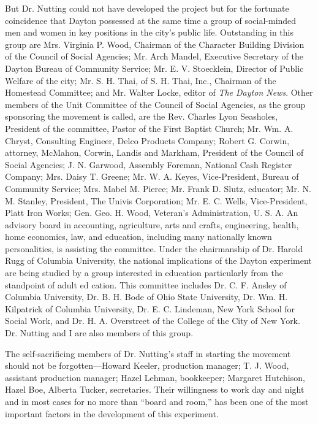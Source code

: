 \documentclass{book}
\begin{document}
But Dr. Nutting could not have developed the project but for the fortunate coincidence that Dayton possessed at the same time a group of social-minded men and women in key positions in the city’s public life. Outstanding in this group are Mrs. Virginia P. Wood, Chairman of the Character Building Division of the Council of Social Agencies; Mr. Arch Mandel, Executive Secretary of the Dayton Bureau of Community Service; Mr. E. V. Stoecklein, Director of Public Welfare of the city; Mr. S. H. Thai, of S. H. Thai, Inc., Chairman of the Homestead Committee; and Mr. Walter Locke, editor of \emph{The Dayton News}. Other members of the Unit Committee of the Council of Social Agencies, as the group sponsoring the movement is called, are the Rev. Charles Lyon Seasholes, President of the committee, Pastor of the First Baptist Church; Mr. Wm. A. Chryst, Consulting Engineer, Delco Products Company; Robert G. Corwin, attorney, McMahon, Corwin, Landis and Markham, President of the Council of Social Agencies; J. N. Garwood, Assembly Foreman, National Cash Register Company; Mrs. Daisy T. Greene; Mr. W. A. Keyes, Vice-President, Bureau of Community Service; Mrs. Mabel M. Pierce; Mr. Frank D. Slutz, educator; Mr. N. M. Stanley, President, The Univis Corporation; Mr. E. C. Wells, Vice-President, Platt Iron Works; Gen. Geo. H. Wood, Veteran’s Administration, U. S. A. An advisory board in accounting, agriculture, arts and crafts, engineering, health, home economics, law, and education, including many nationally known personalities, is assisting the committee. Under the chairmanship of Dr. Harold Rugg of Columbia University, the national implications of the Dayton experiment are being studied by a group interested in education particularly from the standpoint of adult ed cation. This committee includes Dr. C. F. Ansley of Columbia University, Dr. B. H. Bode of Ohio State University, Dr. Wm. H. Kilpatrick of Columbia University, Dr. E. C. Lindeman, New York School for Social Work, and Dr. H. A. Overstreet of the College of the City of New York. Dr. Nutting and I are also members of this group.

The self-sacrificing members of Dr. Nutting’s staff in starting the movement should not be forgotten—Howard Keeler, production manager; T. J. Wood, assistant production manager; Hazel Lehman, bookkeeper; Margaret Hutchison, Hazel Boe, Alberta Tucker, secretaries. Their willingness to work day and night and in most cases for no more than “board and room,” has been one of the most important factors in the development of this experiment.
\end{document}
